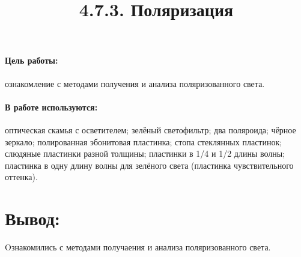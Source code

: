 \documentclass[12pt]{article}
\title{4.7.3. Поляризация}
\date{}
\begin{document}
\maketitle

\paragraph{Цель работы:}ознакомление с методами получения и анализа поляризованного света.

\paragraph{В работе используются:}оптическая скамья с осветителем; зелёный светофильтр; два поляроида; чёрное зеркало; полированная эбонитовая пластинка; стопа стеклянных пластинок; слюдяные пластинки разной толщины; пластинки в 1/4 и 1/2 длины волны; пластинка в одну длину волны для зелёного света (пластинка чувствительного оттенка).


\newpage

\newpage


\section*{Вывод:} Oзнакомились с методами получаения и анализа поляризованного света.
\end{document}
